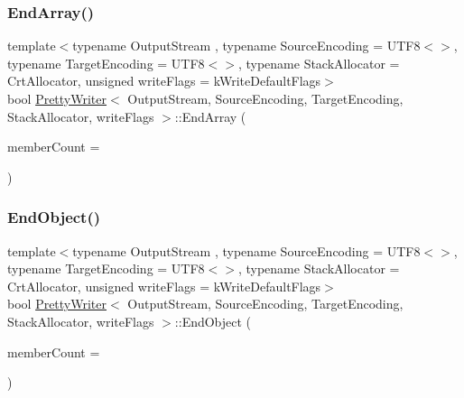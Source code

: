 \subsubsection{\texorpdfstring{End\+Array()}{EndArray()}}
{\footnotesize\ttfamily template$<$typename Output\+Stream , typename Source\+Encoding  = U\+T\+F8$<$$>$, typename Target\+Encoding  = U\+T\+F8$<$$>$, typename Stack\+Allocator  = Crt\+Allocator, unsigned write\+Flags = k\+Write\+Default\+Flags$>$ \\
bool \hyperlink{classPrettyWriter}{Pretty\+Writer}$<$ Output\+Stream, Source\+Encoding, Target\+Encoding, Stack\+Allocator, write\+Flags $>$\+::End\+Array (\begin{DoxyParamCaption}\item[{\hyperlink{rapidjson_8h_a5ed6e6e67250fadbd041127e6386dcb5}{Size\+Type}}]{member\+Count = {} }\end{DoxyParamCaption})\hspace{0.3cm}{\ttfamily [inline]}}

\mbox{\label{classPrettyWriter_a6bfdfa4193193ef763cce5c592c4d20c}} 
\subsubsection{\texorpdfstring{End\+Object()}{EndObject()}}
{\footnotesize\ttfamily template$<$typename Output\+Stream , typename Source\+Encoding  = U\+T\+F8$<$$>$, typename Target\+Encoding  = U\+T\+F8$<$$>$, typename Stack\+Allocator  = Crt\+Allocator, unsigned write\+Flags = k\+Write\+Default\+Flags$>$ \\
bool \hyperlink{classPrettyWriter}{Pretty\+Writer}$<$ Output\+Stream, Source\+Encoding, Target\+Encoding, Stack\+Allocator, write\+Flags $>$\+::End\+Object (\begin{DoxyParamCaption}\item[{\hyperlink{rapidjson_8h_a5ed6e6e67250fadbd041127e6386dcb5}{Size\+Type}}]{member\+Count = {} }\end{DoxyParamCaption})\hspace{0.3cm}{\ttfamily [inline]}}

\mbox{\label{classPrettyWriter_aa1815263e61cb7af3b6dfba480a0f481}} 
